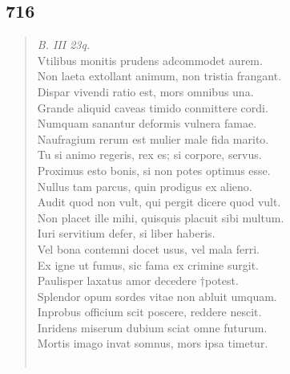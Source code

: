 \documentclass[11pt, a4paper]{report}
\begin{document}
            \subsection*{716}
      \begin{verse}
      \textit{B. III 23q.} \\ Vtilibus monitis prudens adcommodet aurem. \\ Non laeta extollant animum, non tristia frangant. \\ Dispar vivendi ratio est, mors omnibus una. \\ Grande aliquid caveas timido conmittere cordi. \\ Numquam sanantur deformis vulnera famae. \\ Naufragium rerum est mulier male fida marito. \\ Tu si animo regeris, rex es; si corpore, servus. \\ Proximus esto bonis, si non potes optimus esse. \\ Nullus tam parcus, quin prodigus ex alieno. \\ Audit quod non vult, qui pergit dicere quod vult. \\ Non placet ille mihi, quisquis placuit sibi multum. \\ Iuri servitium defer, si liber haberis. \\ Vel bona contemni docet usus, vel mala ferri. \\ Ex igne ut fumus, sic fama ex crimine surgit. \\ Paulisper laxatus amor decedere †potest. \\ Splendor opum sordes vitae non abluit umquam. \\ Inprobus officium scit poscere, reddere nescit. \\ Inridens miserum dubium sciat omne futurum. \\ Mortis imago invat somnus, mors ipsa timetur. \\ 
        ﻿\pagebreak 

\end{verse}
\end{document}

